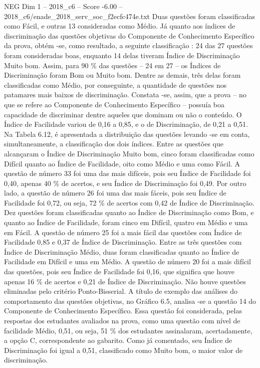\begin{textsample}{NEG Dim 1 – 2018\_c6 – Score -6.00 – 2018\_c6/enade\_2018\_serv\_soc\_f2ecfc474e.txt}
Duas questões foram classificadas como Fácil, e outras 13 consideradas como Médio.
Já quanto aos índices de discriminação das questões objetivas do Componente de Conhecimento Específico da prova, obtém -se, como resultado, a seguinte classificação : 24 das 27 questões foram consideradas boas, enquanto 14 delas tiveram Índice de Discriminação Muito bom.
Assim, para 90 \% das questões – 24 em 27 – os Índices de Discriminação foram Bom ou Muito bom.
Dentre as demais, três delas foram classificadas como Médio, por conseguinte, a quantidade de questões nos patamares mais baixos de discriminação.
Constata -se, assim, que a prova – no que se refere ao Componente de Conhecimento Específico – possuía boa capacidade de discriminar dentre aqueles que dominam ou não o conteúdo.
O Índice de Facilidade variou de 0,16 a 0,85, e o de Discriminação, de 0,21 a 0,51.
Na Tabela 6.12, é apresentada a distribuição das questões levando -se em conta, simultaneamente, a classificação dos dois índices.
Entre as questões que alcançaram o Índice de Discriminação Muito bom, cinco foram classificadas como Difícil quanto ao Índice de Facilidade, oito como Médio e uma como Fácil.
A questão de número 33 foi uma das mais difíceis, pois seu Índice de Facilidade foi 0,40, apenas 40 \% de acertos, e seu Índice de Discriminação foi 0,49.
Por outro lado, a questão de número 26 foi uma das mais fáceis, pois seu Índice de Facilidade foi 0,72, ou seja, 72 \% de acertos com 0,42 de Índice de Discriminação.
Dez questões foram classificadas quanto ao Índice de Discriminação como Bom, e quanto ao Índice de Facilidade, foram cinco em Difícil, quatro em Médio e uma em Fácil.
A questão de número 25 foi a mais fácil das questões com Índice de Facilidade 0,85 e 0,37 de Índice de Discriminação.
Entre as três questões com Índice de Discriminação Médio, duas foram classificadas quanto ao Índice de Facilidade em Difícil e uma em Médio.
A questão de número 20 foi a mais difícil das questões, pois seu Índice de Facilidade foi 0,16, que significa que houve apenas 16 \% de acertos e 0,21 de Índice de Discriminação.
Não houve questões eliminadas pelo critério Ponto-Bisserial.
A título de exemplo das análises do comportamento das questões objetivas, no Gráfico 6.5, analisa -se a questão 14 do Componente de Conhecimento Específico.
Essa questão foi considerada, pelas respostas dos estudantes avaliados na prova, como uma questão com nível de facilidade Médio, 0,51, ou seja, 51 \% dos estudantes assinalaram, acertadamente, a opção C, correspondente ao gabarito.
Como já comentado, seu Índice de Discriminação foi igual a 0,51, classificado como Muito bom, o maior valor de discriminação.

\end{textsample}
